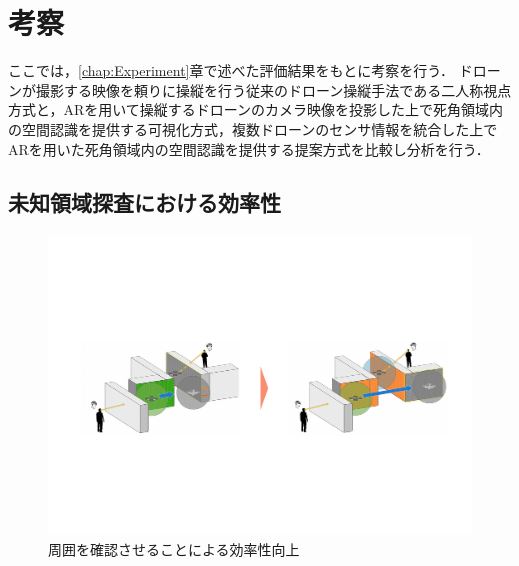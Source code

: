 \documentclass[a4paper,11pt]{ujreport}
\begin{document}
\chapter{考察}
\label{chap:Discussion}

ここでは，\ref{chap:Experiment}章で述べた評価結果をもとに考察を行う．
ドローンが撮影する映像を頼りに操縦を行う従来のドローン操縦手法である二人称視点方式と，ARを用いて操縦するドローンのカメラ映像を投影した上で死角領域内の空間認識を提供する可視化方式，複数ドローンのセンサ情報を統合した上でARを用いた死角領域内の空間認識を提供する提案方式を比較し分析を行う．

\section{未知領域探査における効率性}
\label{sec:Efficiency}

\begin{figure}[!b]
  \centering
  \includegraphics[width=0.9\linewidth]{img/06_efficiency.pdf}
  \caption{周囲を確認させることによる効率性向上}
  \label{fig:06_efficiency}
\end{figure}
\end{document}
